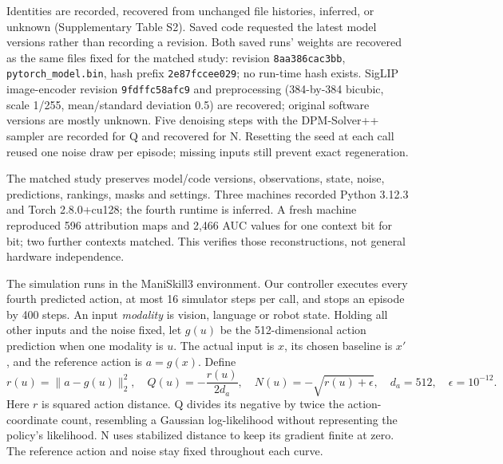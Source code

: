 \documentclass[12pt,letterpaper]{article}
\makeatletter
\renewcommand\subsection{\@startsection{subsection}{2}{\z@}{6pt}{3pt}{\normalfont\normalsize\bfseries}}
\makeatother
\begin{document}
Identities are recorded, recovered from unchanged file histories, inferred, or unknown (Supplementary Table S2). Saved code requested the latest model versions rather than recording a revision. Both saved runs' weights are recovered as the same files fixed for the matched study: revision \texttt{8aa386cac3bb}, \texttt{pytorch\_model.bin}, hash prefix \texttt{2e87fccee029}; no run-time hash exists. SigLIP image-encoder revision \texttt{9fdffc58afc9} and preprocessing (384-by-384 bicubic, scale 1/255, mean/standard deviation 0.5) are recovered; original software versions are mostly unknown. Five denoising steps with the DPM-Solver++ sampler\citep{lu2022dpm} are recorded for Q and recovered for N. Resetting the seed at each call reused one noise draw per episode; missing inputs still prevent exact regeneration.

The matched study preserves model/code versions, observations, state, noise, predictions, rankings, masks and settings. Three machines recorded Python 3.12.3 and Torch 2.8.0+cu128; the fourth runtime is inferred. A fresh machine reproduced 596 attribution maps and 2,466 AUC values for one context bit for bit; two further contexts matched. This verifies those reconstructions, not general hardware independence.

\subsection{Targets and input replacement}
The simulation runs in the ManiSkill3 environment\citep{tao2024maniskill3}. Our controller executes every fourth predicted action, at most 16 simulator steps per call, and stops an episode by 400 steps. An input \emph{modality} is vision, language or robot state. Holding all other inputs and the noise fixed, let $g(u)$ be the 512-dimensional action prediction when one modality is $u$. The actual input is $x$, its chosen baseline is $x'$, and the reference action is $a=g(x)$. Define
\begin{equation}
r(u)=\lVert a-g(u)\rVert_2^2,\quad Q(u)=-\frac{r(u)}{2d_a},\quad N(u)=-\sqrt{r(u)+\epsilon},\quad d_a=512,\quad\epsilon=10^{-12}.
\label{eq:targets}
\end{equation}
Here $r$ is squared action distance. Q divides its negative by twice the action-coordinate count, resembling a Gaussian log-likelihood without representing the policy's likelihood. N uses stabilized distance to keep its gradient finite at zero. The reference action and noise stay fixed throughout each curve.
\end{document}
